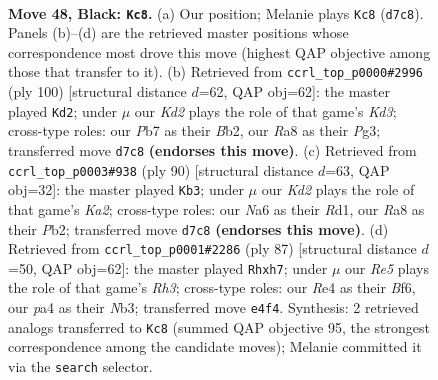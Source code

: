 \documentclass[11pt]{article}
\begin{document}
\clearpage

\begin{figure}[p]\centering
\begin{subfigure}{0.46\textwidth}\centering
\resizebox{\linewidth}{!}{%
\newchessgame
\chessboard[
  setfen={r2b4/1p1k3p/n5pP/p4p2/P2BrN2/3R2P1/8/6RK b - - 4 48},
  showmover=false,
  pgfstyle=straightmove, color=movearrow, markmove={d7-c8}
]}
\caption{}
\end{subfigure}\hfill
\begin{subfigure}{0.46\textwidth}\centering
\resizebox{\linewidth}{!}{%
\newchessgame
\chessboard[
  setfen={3rk3/1p3p2/pPn3p1/P1Rb4/3P4/3K2P1/1B2B3/8 w - - 0 51},
  showmover=false,
  pgfstyle=straightmove, color=movearrow, markmove={d3-d2}
]}
\caption{}
\end{subfigure}
\\[4pt]
\begin{subfigure}{0.46\textwidth}\centering
\resizebox{\linewidth}{!}{%
\newchessgame
\chessboard[
  setfen={5k2/2nRrr2/2P3pp/1p6/7P/P7/KP3pB1/3R4 w - - 4 46},
  showmover=false,
  pgfstyle=straightmove, color=movearrow, markmove={a2-b3}
]}
\caption{}
\end{subfigure}\hfill
\begin{subfigure}{0.46\textwidth}\centering
\resizebox{\linewidth}{!}{%
\newchessgame
\chessboard[
  setfen={8/2k3rB/p4b1r/1p2N3/2p2P2/1nP5/1P3BP1/1K1RR3 b - - 0 44},
  showmover=false,
  pgfstyle=straightmove, color=movearrow, markmove={h6-h7}
]}
\caption{}
\end{subfigure}
\caption{\textbf{Move 48, Black: \texttt{Kc8}.} (a) Our position; Melanie plays \texttt{Kc8} (\texttt{d7c8}). Panels (b)--(d) are the retrieved master positions whose correspondence most drove this move (highest QAP objective among those that transfer to it). (b) Retrieved from \texttt{ccrl\_top\_p0000\#2996} (ply 100) [structural distance $d$=62, QAP obj=62]: the master played \texttt{Kd2}; under $\mu$ our \emph{Kd2} plays the role of that game's \emph{Kd3}; cross-type roles: our \emph{P}b7 as their \emph{B}b2, our \emph{R}a8 as their \emph{P}g3; transferred move \texttt{d7c8} \textbf{(endorses this move)}. (c) Retrieved from \texttt{ccrl\_top\_p0003\#938} (ply 90) [structural distance $d$=63, QAP obj=32]: the master played \texttt{Kb3}; under $\mu$ our \emph{Kd2} plays the role of that game's \emph{Ka2}; cross-type roles: our \emph{N}a6 as their \emph{R}d1, our \emph{R}a8 as their \emph{P}b2; transferred move \texttt{d7c8} \textbf{(endorses this move)}. (d) Retrieved from \texttt{ccrl\_top\_p0001\#2286} (ply 87) [structural distance $d$=50, QAP obj=62]: the master played \texttt{Rhxh7}; under $\mu$ our \emph{Re5} plays the role of that game's \emph{Rh3}; cross-type roles: our \emph{R}e4 as their \emph{B}f6, our \emph{p}a4 as their \emph{N}b3; transferred move \texttt{e4f4}. Synthesis: 2 retrieved analogs transferred to \texttt{Kc8} (summed QAP objective 95, the strongest correspondence among the candidate moves); Melanie committed it via the \texttt{search} selector.}
\label{fig:thought-m95}
\end{figure}
\end{document}

